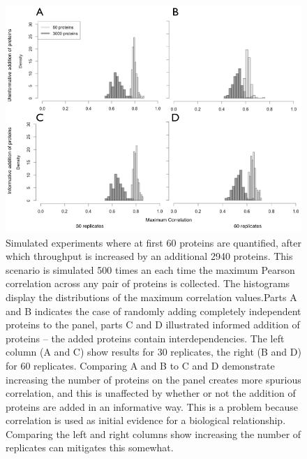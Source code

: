 \documentclass[journal=jacsat,manuscript=article]{achemso}
\begin{document}
\begin{figure}[!tpb]
\centerline{\includegraphics[width=.8\textwidth]{figs/spurious_corr2.png}}
\caption{Simulated experiments where at first 60 proteins are quantified, after which throughput is increased by an additional 2940 proteins.  This scenario is simulated 500 times an each time the maximum Pearson correlation across any pair of proteins is collected. The histograms display the distributions of the maximum correlation values.Parts A and B indicates the case of randomly adding completely independent proteins to the panel, parts C and D illustrated informed addition of proteins -- the added proteins contain interdependencies.  The left column (A and C) show results for 30 replicates, the right (B and D) for 60 replicates. Comparing A and B to C and D demonstrate increasing the number of proteins on the panel creates more spurious correlation, and this is unaffected by whether or not the addition of proteins are added in an informative way.  This is a problem because correlation is used as initial evidence for a biological relationship.  Comparing the left and right columns show increasing the number of replicates can mitigates this somewhat.}
\label{spur_corr}
\end{figure}
\end{document}
